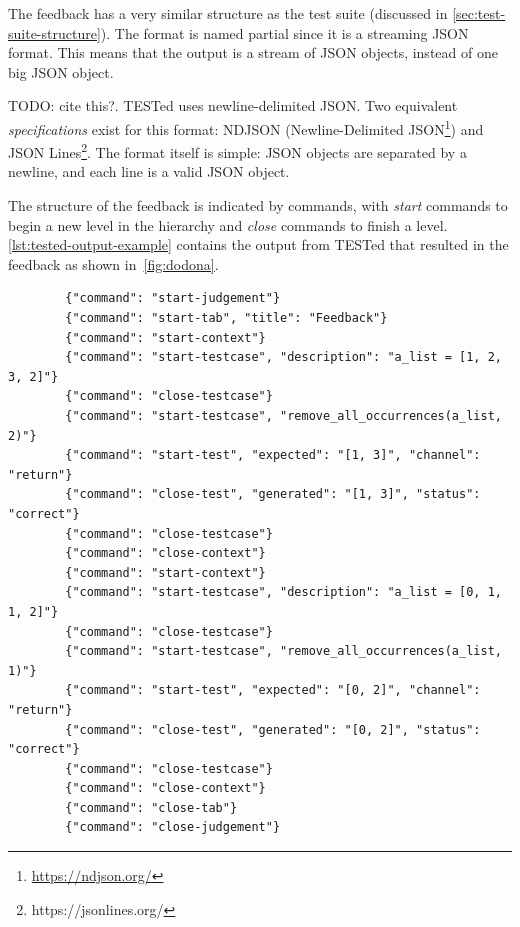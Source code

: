 \documentclass[../main]{subfiles}
\begin{document}
The feedback has a very similar structure as the test suite (discussed in \cref{sec:test-suite-structure}).
The format is named partial since it is a streaming JSON format.
This means that the output is a stream of JSON objects, instead of one big JSON object.

TODO: cite this?.
TESTed uses newline-delimited JSON\@.
Two equivalent \emph{specifications} exist for this format: NDJSON (Newline-Delimited JSON\footnote{\url{https://ndjson.org/}}) and JSON Lines\footnote{https://jsonlines.org/}.
The format itself is simple: JSON objects are separated by a newline, and each line is a valid JSON object.

The structure of the feedback is indicated by commands, with \emph{start} commands to begin a new level in the hierarchy and \emph{close} commands to finish a level.
\cref{lst:tested-output-example} contains the output from TESTed that resulted in the feedback as shown in~\cref{fig:dodona}.

\begin{listing}
    \begin{verbatim}
        {"command": "start-judgement"}
        {"command": "start-tab", "title": "Feedback"}
        {"command": "start-context"}
        {"command": "start-testcase", "description": "a_list = [1, 2, 3, 2]"}
        {"command": "close-testcase"}
        {"command": "start-testcase", "remove_all_occurrences(a_list, 2)"}
        {"command": "start-test", "expected": "[1, 3]", "channel": "return"}
        {"command": "close-test", "generated": "[1, 3]", "status": "correct"}
        {"command": "close-testcase"}
        {"command": "close-context"}
        {"command": "start-context"}
        {"command": "start-testcase", "description": "a_list = [0, 1, 1, 2]"}
        {"command": "close-testcase"}
        {"command": "start-testcase", "remove_all_occurrences(a_list, 1)"}
        {"command": "start-test", "expected": "[0, 2]", "channel": "return"}
        {"command": "close-test", "generated": "[0, 2]", "status": "correct"}
        {"command": "close-testcase"}
        {"command": "close-context"}
        {"command": "close-tab"}
        {"command": "close-judgement"}
    \end{verbatim}
    \caption{
        Example of the output generated by TESTed, which is rendered in \cref{fig:dodona}.
        Note that the names of the levels are the Dodona levels (tab, contex and testcase), instead of unit, testcase and script.
        As before, each testcase consists of two tests, the first of which has no script, while
        the second has one script (the expected return value).
    }
    \label{lst:tested-output-example}
\end{listing}
\end{document}
